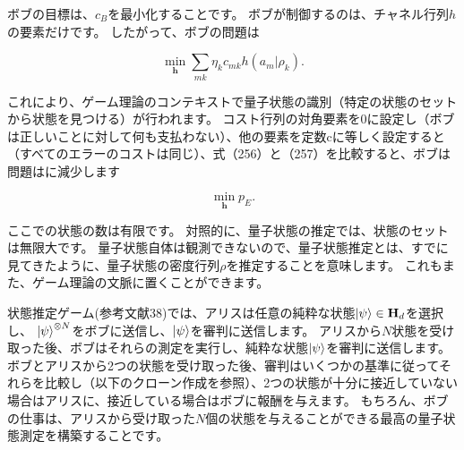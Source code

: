 ボブの目標は、$c_B$を最小化することです。 ボブが制御するのは、チャネル行列$h$の要素だけです。 したがって、ボブの問題は

\begin{equation}
\label{258}
\min_{\mathbf{h}}
\sum_{mk} \eta_k c_{mk} h(a_m|\rho_k) .
\end{equation}

これにより、ゲーム理論のコンテキストで量子状態の識別（特定の状態のセットから状態を見つける）が行われます。
コスト行列の対角要素を0に設定し（ボブは正しいことに対して何も支払わない）、他の要素を定数cに等しく設定すると（すべてのエラーのコストは同じ）、式（256）と（257）を比較すると、ボブは 問題はに減少します

\begin{equation}
\label{259}
\min _{\mathbf{h}} p_E.
\end{equation}

ここでの状態の数は有限です。 対照的に、量子状態の推定では、状態のセットは無限大です。
量子状態自体は観測できないので、量子状態推定とは、すでに見てきたように、量子状態の密度行列$\rho$を推定することを意味します。
これもまた、ゲーム理論の文脈に置くことができます。

状態推定ゲーム(参考文献38)では、アリスは任意の純粋な状態$\ket{\psi} \in \mathbf{H}_d$を選択し、
$\ket{\psi}^{\otimes N}$をボブに送信し、$\ket{\psi}$を審判に送信します。
アリスから$N$状態を受け取った後、ボブはそれらの測定を実行し、純粋な状態$\ket{\psi}$を審判に送信します。
ボブとアリスから2つの状態を受け取った後、審判はいくつかの基準に従ってそれらを比較し（以下のクローン作成を参照）、2つの状態が十分に接近していない場合はアリスに、接近している場合はボブに報酬を与えます。
もちろん、ボブの仕事は、アリスから受け取った$N$個の状態を与えることができる最高の量子状態測定を構築することです。


